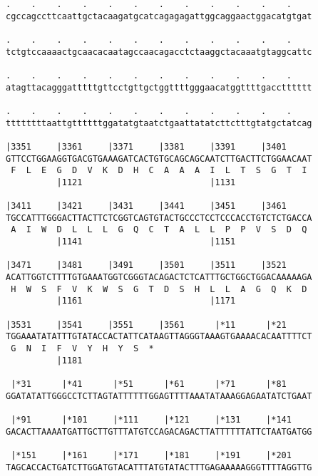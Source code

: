 \documentclass{article}
\begin{document}
\begin{Verbatim}
.    .    .    .    .    .    .    .    .    .    .    .    
cgccagccttcaattgctacaagatgcatcagagagattggcaggaactggacatgtgat
                                                            
.    .    .    .    .    .    .    .    .    .    .    .    
tctgtccaaaactgcaacacaatagccaacagacctctaaggctacaaatgtaggcattc
                                                            
.    .    .    .    .    .    .    .    .    .    .    .    
atagttacagggatttttgttcctgttgctggttttgggaacatggttttgacctttttt
                                                            
.    .    .    .    .    .    .    .    .    .    .    .    
ttttttttaattgttttttggatatgtaatctgaattatatcttctttgtatgctatcag
                                                            
|3351     |3361     |3371     |3381     |3391     |3401     
GTTCCTGGAAGGTGACGTGAAAGATCACTGTGCAGCAGCAATCTTGACTTCTGGAACAAT
 F  L  E  G  D  V  K  D  H  C  A  A  A  I  L  T  S  G  T  I 
          |1121                         |1131               
  
|3411     |3421     |3431     |3441     |3451     |3461     
TGCCATTTGGGACTTACTTCTCGGTCAGTGTACTGCCCTCCTCCCACCTGTCTCTGACCA
 A  I  W  D  L  L  L  G  Q  C  T  A  L  L  P  P  V  S  D  Q 
          |1141                         |1151               
  
|3471     |3481     |3491     |3501     |3511     |3521     
ACATTGGTCTTTTGTGAAATGGTCGGGTACAGACTCTCATTTGCTGGCTGGACAAAAAGA
 H  W  S  F  V  K  W  S  G  T  D  S  H  L  L  A  G  Q  K  D 
          |1161                         |1171               
  
|3531     |3541     |3551     |3561      |*11      |*21     
TGGAAATATATTTGTATACCACTATTCATAAGTTAGGGTAAAGTGAAAACACAATTTTCT
 G  N  I  F  V  Y  H  Y  S  *   
          |1181                                             
  
 |*31      |*41      |*51      |*61      |*71      |*81     
GGATATATTGGGCCTCTTAGTATTTTTTGGAGTTTTAAATATAAAGGAGAATATCTGAAT
                                                            
 |*91      |*101     |*111     |*121     |*131     |*141    
GACACTTAAAATGATTGCTTGTTTATGTCCAGACAGACTTATTTTTTATTCTAATGATGG
                                                            
 |*151     |*161     |*171     |*181     |*191     |*201    
TAGCACCACTGATCTTGGATGTACATTTATGTATACTTTGAGAAAAAGGGTTTTAGGTTG
                                                            

\end{Verbatim}
\end{document}
